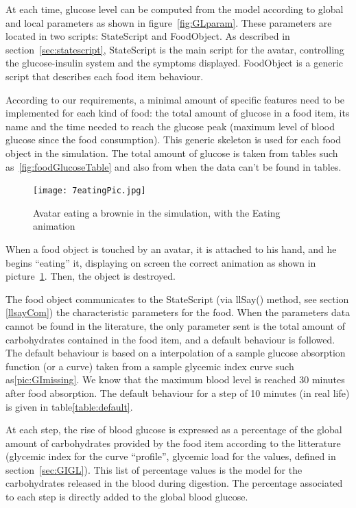 At each time, glucose level can be computed from the model according to global and local parameters as shown in figure~\ref{fig:GLparam}. These parameters are located in two scripts: StateScript and FoodObject. As described in section~\ref{sec:statescript}, StateScript is the main script for the avatar, controlling the glucose-insulin system and the symptoms displayed. FoodObject is a generic script that describes each food item behaviour. 

According to our requirements, a minimal amount of specific features need to be implemented for each kind of food: the total amount of glucose in a food item, its name and the time needed to reach the glucose peak (maximum level of blood glucose since the food consumption). This generic skeleton is used for each food object in the simulation. The total amount of glucose is taken from tables such as~\ref{fig:foodGlucoseTable} and also from \cite{nutritiondataWebsite} 
when the data can't be found in tables. \\



\begin{figure}[h]
  \caption{Avatar eating a brownie in the simulation, with the Eating animation}
  \centering
  \texttt{[image: 7eatingPic.jpg]}
  \label{fig:7eatingPic}
\end{figure}

When a food object is touched by an avatar, it is attached to his hand, and he begins ``eating'' it, displaying on screen the correct animation as shown in picture~\ref{fig:7eatingPic}. Then, the object is destroyed.

The food object communicates to the StateScript (via llSay() method, see section \ref{llsayCom}) the characteristic parameters for the food. When the parameters data cannot be found in the literature, the only parameter sent is the total amount of carbohydrates contained in the food item, and a default behaviour is followed. The default behaviour is based on a interpolation of a sample glucose absorption function (or a curve) taken from a sample glycemic index curve such as\ref{pic:GImissing}. %
We know that the maximum blood level is reached 30 minutes after food absorption.
The default behaviour for a step of 10 minutes (in real life) is given in table\ref{table:default}. %

At each step, the rise of blood glucose is expressed as a percentage of the global amount of carbohydrates provided by the food item according to the litterature (glycemic index for the curve ``profile'', glycemic load for the values, defined in section~\ref{sec:GIGL}). This list of percentage values is the model for the carbohydrates released in the blood during digestion. 
The percentage associated to each step is directly added to the global blood glucose. 

